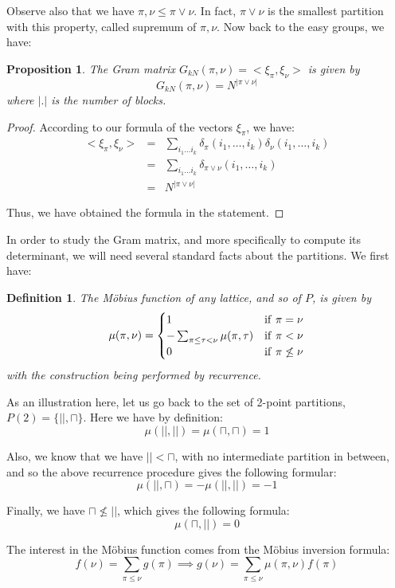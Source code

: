 \documentclass[12pt]{amsbook}
\newtheorem{definition}[theorem]{Definition}
\newtheorem{proposition}[theorem]{Proposition}
\begin{document}
Observe also that we have $\pi,\nu\leq\pi\vee\nu$. In fact, $\pi\vee\nu$ is the smallest partition with this property, called supremum of $\pi,\nu$. Now back to the easy groups, we have:

\begin{proposition}
The Gram matrix $G_{kN}(\pi,\nu)=<\xi_\pi,\xi_\nu>$ is given by
$$G_{kN}(\pi,\nu)=N^{|\pi\vee\nu|}$$
where $|.|$ is the number of blocks.
\end{proposition}

\begin{proof}
According to our formula of the vectors $\xi_\pi$, we have:
\begin{eqnarray*}
<\xi_\pi,\xi_\nu>
&=&\sum_{i_1\ldots i_k}\delta_\pi(i_1,\ldots,i_k)\delta_\nu(i_1,\ldots,i_k)\\
&=&\sum_{i_1\ldots i_k}\delta_{\pi\vee\nu}(i_1,\ldots,i_k)\\
&=&N^{|\pi\vee\nu|}
\end{eqnarray*}

Thus, we have obtained the formula in the statement.
\end{proof}

In order to study the Gram matrix, and more specifically to compute its determinant, we will need several standard facts about the partitions. We first have:

\begin{definition}
The M\"obius function of any lattice, and so of $P$, is given by
$$\mu(\pi,\nu)=\begin{cases}
1&{\rm if}\ \pi=\nu\\
-\sum_{\pi\leq\tau<\nu}\mu(\pi,\tau)&{\rm if}\ \pi<\nu\\
0&{\rm if}\ \pi\not\leq\nu
\end{cases}$$
with the construction being performed by recurrence.
\end{definition}

As an illustration here, let us go back to the set of 2-point partitions, $P(2)=\{||,\sqcap\}$. Here we have by definition:
$$\mu(||,||)=\mu(\sqcap,\sqcap)=1$$

Also, we know that we have $||<\sqcap$, with no intermediate partition in between, and so the above recurrence procedure gives the following formular:
$$\mu(||,\sqcap)=-\mu(||,||)=-1$$

Finally, we have $\sqcap\not\leq||$, which gives the following formula:
$$\mu(\sqcap,||)=0$$

The interest in the M\"obius function comes from the M\"obius inversion formula:
$$f(\nu)=\sum_{\pi\leq\nu}g(\pi)\implies g(\nu)=\sum_{\pi\leq\nu}\mu(\pi,\nu)f(\pi)$$
\end{document}
